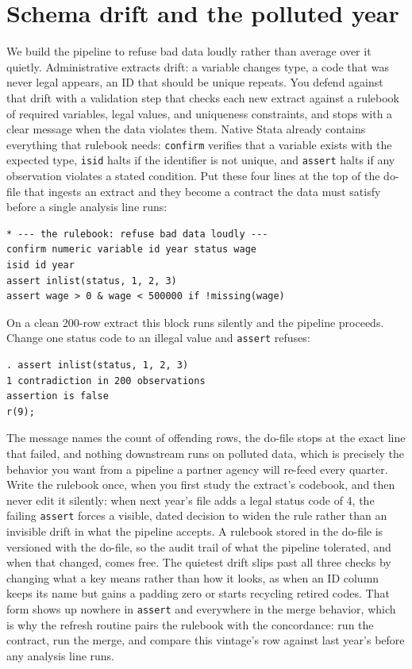 \documentclass[
    a4paper,
    fontsize=10pt,
    twoside=true,
    numbers=noenddot,
]{kaobook}
\begin{document}
\section{Schema drift and the polluted year}
We build the pipeline to refuse bad data loudly rather than average over it quietly. Administrative extracts drift: a variable changes type, a code that was never legal appears, an ID that should be unique repeats. You defend against that drift with a validation step that checks each new extract against a rulebook of required variables, legal values, and uniqueness constraints, and stops with a clear message when the data violates them. Native Stata already contains everything that rulebook needs: \texttt{confirm} verifies that a variable exists with the expected type, \texttt{isid} halts if the identifier is not unique, and \texttt{assert} halts if any observation violates a stated condition. Put these four lines at the top of the do-file that ingests an extract and they become a contract the data must satisfy before a single analysis line runs:
\par
{\footnotesize
\begin{verbatim}
* --- the rulebook: refuse bad data loudly ---
confirm numeric variable id year status wage
isid id year
assert inlist(status, 1, 2, 3)
assert wage > 0 & wage < 500000 if !missing(wage)
\end{verbatim}
}
On a clean 200-row extract this block runs silently and the pipeline proceeds. Change one status code to an illegal value and \texttt{assert} refuses:
\par
{\footnotesize
\begin{verbatim}
. assert inlist(status, 1, 2, 3)
1 contradiction in 200 observations
assertion is false
r(9);
\end{verbatim}
}
The message names the count of offending rows, the do-file stops at the exact line that failed, and nothing downstream runs on polluted data, which is precisely the behavior you want from a pipeline a partner agency will re-feed every quarter. Write the rulebook once, when you first study the extract's codebook, and then never edit it silently: when next year's file adds a legal status code of 4, the failing \texttt{assert} forces a visible, dated decision to widen the rule rather than an invisible drift in what the pipeline accepts. A rulebook stored in the do-file is versioned with the do-file, so the audit trail of what the pipeline tolerated, and when that changed, comes free. The quietest drift slips past all three checks by changing what a key means rather than how it looks, as when an ID column keeps its name but gains a padding zero or starts recycling retired codes. That form shows up nowhere in \texttt{assert} and everywhere in the merge behavior, which is why the refresh routine pairs the rulebook with the concordance: run the contract, run the merge, and compare this vintage's row against last year's before any analysis line runs.
\end{document}
